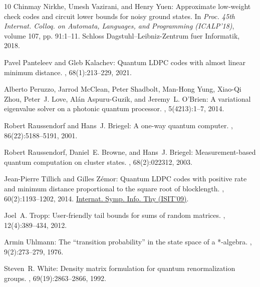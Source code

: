 \documentclass[11pt]{article}
\begin{document}
\begin{thebibliography}{10}
{\sc Chinmay Nirkhe, Umesh Vazirani, and Henry Yuen}: Approximate low-weight
  check codes and circuit lower bounds for noisy ground states.
\newblock In {\em Proc. 45th Internat. Colloq. on Automata, Languages, and
  Programming (ICALP'18)}, volume 107, pp. 91:1--11. Schloss
  Dagstuhl--Leibniz-Zentrum fuer Informatik, 2018.

{\sc Pavel Panteleev and Gleb Kalachev}: Quantum {LDPC} codes with almost
  linear minimum distance.
, 68(1):213--229, 2021.

{\sc Alberto Peruzzo, Jarrod McClean, Peter Shadbolt, Man-Hong Yung, Xiao-Qi
  Zhou, Peter~J. Love, Al{\'a}n Aspuru-Guzik, and Jeremy~L. O'Brien}: A
  variational eigenvalue solver on a photonic quantum processor.
, 5(4213):1--7, 2014.

{\sc Robert Raussendorf and Hans~J. Briegel}: A one-way quantum computer.
, 86(22):5188--5191, 2001.

{\sc Robert Raussendorf, Daniel~E. Browne, and Hans~J. Briegel}:
  Measurement-based quantum computation on cluster states.
, 68(2):022312, 2003.

{\sc Jean-Pierre Tillich and Gilles Z{\'e}mor}: Quantum {LDPC} codes with
  positive rate and minimum distance proportional to the square root of
  blocklength.
, 60(2):1193--1202, 2014.
\newblock \prelim \href{https://doi.org/10.1109/ISIT.2009.5205648}{Internat.
  Symp. Info. Thy (ISIT'09)}.

{\sc Joel~A. Tropp}: User-friendly tail bounds for sums of random matrices.
, 12(4):389--434, 2012.
\newblock [\epfmtdoi{10.1007/s10208-011-9099-z}]

{\sc Armin Uhlmann}: The ``transition probability'' in the state space of a
  *-algebra.
, 9(2):273--279, 1976.
\newblock [\epfmtdoi{10.1016/0034-4877(76)90060-4}]

{\sc Steven~R. White}: Density matrix formulation for quantum renormalization
  groups.
, 69(19):2863--2866, 1992.

\end{thebibliography}
\end{document}
